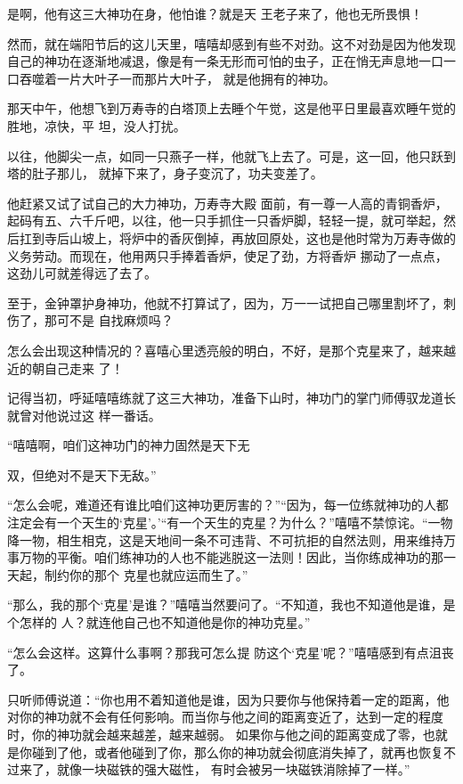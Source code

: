 \documentclass{article}
\begin{document}
是啊，他有这三大神功在身，他怕谁？就是天
王老子来了，他也无所畏惧！ 

然而，就在端阳节后的这儿天里，嘻嘻却感到有些不对劲。这不对劲是因为他发现自己的神功在逐渐地减退，像是有一条无形而可怕的虫子，正在悄无声息地一口一口吞噬着一片大叶子一而那片大叶子，
就是他拥有的神功。 

那天中午，他想飞到万寿寺的白塔顶上去睡个午觉，这是他平日里最喜欢睡午觉的胜地，凉快，平
坦，没人打扰。 

以往，他脚尖一点，如同一只燕子一样，他就飞上去了。可是，这一回，他只跃到塔的肚子那儿，
就掉下来了，身子变沉了，功夫变差了。 

他赶紧又试了试自己的大力神功，万寿寺大殿
\newpage
面前，有一尊一人高的青铜香炉，起码有五、六千斤吧，以往，他一只手抓住一只香炉脚，轻轻一提，就可举起，然后扛到寺后山坡上，将炉中的香灰倒掉，再放回原处，这也是他时常为万寿寺做的义务劳动。而现在，他用两只手捧着香炉，使足了劲，方将香炉
挪动了一点点，这劲儿可就差得远了去了。 

至于，金钟罩护身神功，他就不打算试了，因为，万一一试把自己哪里割坏了，刺伤了，那可不是
自找麻烦吗？ 

怎么会出现这种情况的？喜嘻心里透亮般的明白，不好，是那个克星来了，越来越近的朝自己走来
了！ 

记得当初，呼延嘻嘻练就了这三大神功，准备下山时，神功门的掌门师傅驭龙道长就曾对他说过这
样一番话。 

“嘻嘻啊，咱们这神功门的神力固然是天下无

\newpage
双，但绝对不是天下无敌。” 

“怎么会呢，难道还有谁比咱们这神功更厉害的？”“因为，每一位练就神功的人都注定会有一个天生的‘克星’。’“有一个天生的克星？为什么？”嘻嘻不禁惊诧。“一物降一物，相生相克，这是天地间一条不可违背、不可抗拒的自然法则，用来维持万事万物的平衡。咱们练神功的人也不能逃脱这一法则！因此，当你练成神功的那一天起，制约你的那个
克星也就应运而生了。” 

“那么，我的那个‘克星’是谁？”嘻嘻当然要问了。“不知道，我也不知道他是谁，是个怎样的
人？就连他自己也不知道他是你的神功克星。” 

“怎么会这样。这算什么事啊？那我可怎么提
防这个‘克星’呢？”嘻嘻感到有点沮丧了。 

只听师傅说道：“你也用不着知道他是谁，因为只要你与他保持着一定的距离，他对你的神功就不会有任何影响。而当你与他之间的距离变近了，达到一定的程度时，你的神功就会越来越差，越来越弱。
\newpage
如果你与他之间的距离变成了零，也就是你碰到了他，或者他碰到了你，那么你的神功就会彻底消失掉了，就再也恢复不过来了，就像一块磁铁的强大磁性，
有时会被另一块磁铁消除掉了一样。” 
\end{document}
